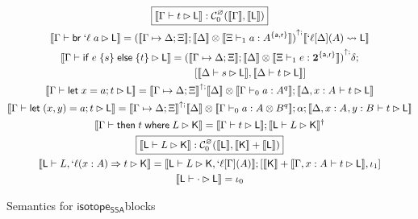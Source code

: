 \documentclass[acmsmall,screen,review]{acmart}
\newcommand{\mc}[1]{\ensuremath{\mathcal{#1}}}
\newcommand{\mb}[1]{\ensuremath{\mathbf{#1}}}
\newcommand{\ms}[1]{\ensuremath{\mathsf{#1}}}
\newcommand{\lbl}[1]{{`#1}}
\newcommand{\lto}{\Rightarrow}
\newcommand{\letstmt}[3]{\ensuremath{\ms{let}\;#1 = #2; #3}}
\newcommand{\brb}[2]{\ms{br}\;#1\;#2}
\newcommand{\lbrb}[2]{\brb{\lbl{#1}}{#2}}
\newcommand{\ite}[3]{\ms{if}\;#1\;\{#2\}\;\ms{else}\;\{#3\}}
\newcommand{\ewhere}[2]{\ms{then}\;#1\;\ms{where}\;#2}
\newcommand{\wbranch}[3]{#1(#2) \lto #3}
\newcommand{\lwbranch}[3]{\wbranch{\lbl{#1}}{#2}{#3}}
\newcommand{\csplits}[3]{#1 \mapsto #2;#3}
\newcommand{\lwk}[2]{#1 \rightsquigarrow #2}
\newcommand{\thyp}[3]{#1: {#2}^{#3}}
\newcommand{\lhyp}[3]{#1[#2](#3)}
\newcommand{\llhyp}[3]{\lhyp{\lbl{#1}}{#2}{#3}}
\newcommand{\tint}{{\{\ms{a}, \ms{r}\}}}
\newcommand{\hasty}[5]{#1 \vdash_{#2} #3: {#4}^{#5}}
\newcommand{\haslb}[3]{#1 \vdash #2 \rhd #3}
\newcommand{\lhaslb}[3]{#1 \vdash #2 \rhd #3}
\newcommand{\dnt}[1]{\llbracket{#1}\rrbracket}
\newcommand{\upg}[2]{{#1}^{\uparrow #2}}
\newcommand{\isotopessa}{\ms{isotope_{SSA}}}
\begin{document}
\begin{figure}
  \begin{gather*}
    \boxed{\dnt{\haslb{\Gamma}{t}{\ms{L}}}
      : \mc{C}_0^\varnothing(\dnt{\Gamma}, \dnt{\ms{L}})} \\
    \dnt{\haslb{\Gamma}{\lbrb{\ell}{a}}{\ms{L}}}
      = \upg{(\dnt{\csplits{\Gamma}{\Delta}{\Xi}}
      ; \dnt{\Delta} \otimes \dnt{\hasty{\Xi}{1}{a}{A}{\tint}})}
      ; \dnt{\lwk{\llhyp{\ell}{\Delta}{A}}{\ms{L}}} \\
    \dnt{\haslb{\Gamma}{\ite{e}{s}{t}}{\ms{L}}}
      = \upg{(\dnt{\csplits{\Gamma}{\Delta}{\Xi}}
      ; \dnt{\Delta} \otimes \dnt{\hasty{\Xi}{1}{e}{\mb{2}}{\tint}})}
      ; \delta ;
      \\ \qquad \qquad \qquad \qquad
      [
        \dnt{\haslb{\Delta}{s}{\ms{L}}}, 
        \dnt{\haslb{\Delta}{t}{\ms{L}}} 
      ]
      \\
    \dnt{\haslb{\Gamma}{\letstmt{x}{a}{t}}{\ms{L}}}
      = \upg{\dnt{\csplits{\Gamma}{\Delta}{\Xi}}}
      ; \dnt{\Delta} \otimes \dnt{\hasty{\Gamma}{0}{a}{A}{q}}
      ; \dnt{\haslb{\Delta, \thyp{x}{A}{}}{t}{\ms{L}}}
      \\
    \dnt{\haslb{\Gamma}{\letstmt{(x, y)}{a}{t}}{\ms{L}}}
      = \upg{\dnt{\csplits{\Gamma}{\Delta}{\Xi}}}
      ; \dnt{\Delta} \otimes \dnt{\hasty{\Gamma}{0}{a}{A \otimes B}{q}}
      ; \alpha
      ; \dnt{\haslb{\Delta, \thyp{x}{A}{}, \thyp{y}{B}{}}{t}{\ms{L}}}
      \\
    \dnt{\haslb{\Gamma}{\ewhere{t}{L}}{\ms{K}}}
      = \dnt{\haslb{\Gamma}{t}{\ms{L}}}
      ; \dnt{\lhaslb{\ms{L}}{L}{\ms{K}}}^\dagger
      \\
    \boxed{\dnt{\lhaslb{\ms{L}}{L}{\ms{K}}}
      : \mc{C}_0^\varnothing(\dnt{\ms{L}}, \dnt{\ms{K}} + \dnt{\ms{L}})}
      \\
    \dnt{\lhaslb{\ms{L}}{L, \lwbranch{\ell}{x: A}{t}}{\ms{K}}}
      = \dnt{\lhaslb{\ms{L}}{L}{\ms{K}, \llhyp{\ell}{\Gamma}{A}}}
      ; [\dnt{\ms{K}} + \dnt{\haslb{\Gamma, \thyp{x}{A}{}}{t}{\ms{L}}}, \iota_1]
      \\
    \dnt{\lhaslb{\ms{L}}{\cdot}{\ms{L}}}
      = \iota_0
  \end{gather*}
  \caption{Semantics for \isotopessa blocks}
  \label{fig:ssa-block-semantics}
\end{figure}
\end{document}
